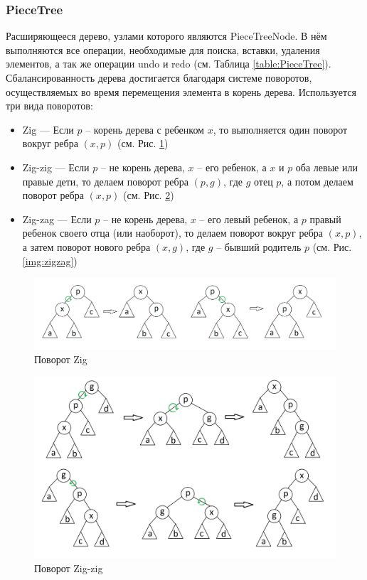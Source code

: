 \documentclass{fefu}
\begin{document}
			\subsubsection{PieceTree}
				\par Расширяющееся дерево, узлами которого являются
				PieceTreeNode. В нём выполняются все операции, необходимые для поиска,
				вставки, удаления элементов, а так же операции undo и redo (см. Таблица 
				\ref{table:PieceTree}). Сбалансированность дерева достигается благодаря системе
				поворотов, осуществляемых во время перемещения элемента в корень дерева. 
				Используется три вида поворотов:
				\begin{itemize}
					\item Zig --- Если $p$ -- корень дерева с ребенком $x$, то выполняется один
					поворот вокруг ребра $(x, p)$ (см. Рис. \ref{img:zig})
					\item Zig-zig --- Если $p$ -- не корень дерева, $x$ -- его ребенок, а $x$ и 
					$p$ оба левые или правые дети, то делаем поворот ребра $(p, g)$, где $g$ 
					отец $p$, а потом делаем поворот ребра $(x, p)$ (см. Рис. \ref{img:zigzig})
					\item Zig-zag --- Если $p$ -- не корень дерева, $x$ -- его левый 
					ребенок, а $p$ правый ребенок своего отца (или наоборот), то делаем
					поворот вокруг ребра $(x, p)$, а затем поворот нового ребра $(x, g)$, где 
					$g$ -- бывший родитель $p$ (см. Рис. \ref{img:zigzag})
				\end{itemize}
				\begin{figure}[H]
					\centering
					\includegraphics[width=0.8\linewidth]{images/zig.png}
					\caption{Поворот Zig}
					\label{img:zig}
				\end{figure}
				\begin{figure}[H]
					\centering
					\includegraphics[width=0.8\linewidth]{images/zigzig.png}
					\caption{Поворот Zig-zig}
					\label{img:zigzig}
				\end{figure}
\end{document}
